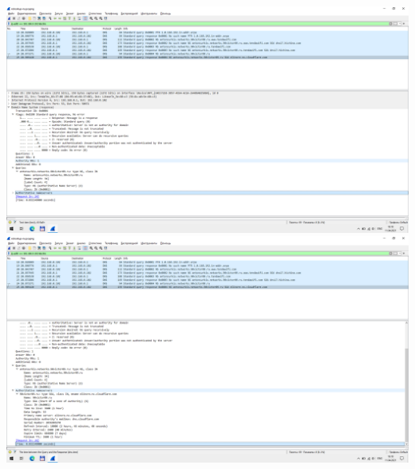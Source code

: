 \includegraphics{screenshots/nslookup-ns_response_1}
\includegraphics{screenshots/nslookup-ns_response_2}
